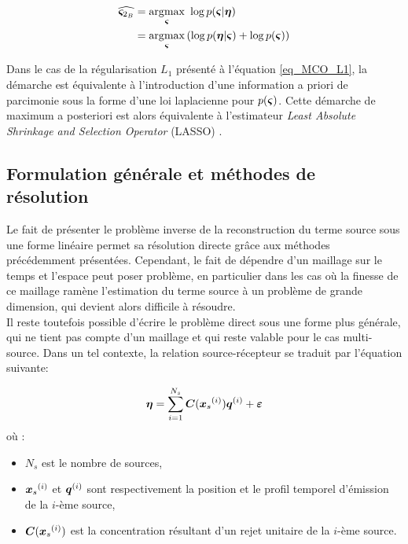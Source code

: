\begin{equation}
{
\begin{split}
\widehat{{\bm{\varsigma}}_{2_B}} &= \operatorname*{\arg\!\max}_{\bm{\varsigma}}~ \log p({\bm{\varsigma}}| {\bm{\eta}}) \\
 &= \operatorname*{\arg\!\max}_ {\bm{\varsigma}}\left(\log p({\bm{\eta}}| {\bm{\varsigma}}) + \log p({\bm{\varsigma}})\right)
\label{eq_MAP}
\end{split}
}
\end{equation}

{
Dans le cas de la régularisation $L_1$ présenté à l'équation \eqref{eq_MCO_L1}, la démarche est équivalente à l'introduction d'une information a priori de parcimonie sous la forme d'une loi laplacienne pour $p({\bm{\varsigma}})$. Cette démarche de maximum a posteriori est alors équivalente à l'estimateur \textit{Least Absolute Shrinkage and Selection Operator} (LASSO) \cite{Tibshirani1996}.\\
}
\subsection{Formulation générale et méthodes de résolution}

Le fait de présenter le problème inverse de la reconstruction du terme source sous une forme linéaire permet sa résolution directe grâce aux méthodes précédemment présentées. Cependant, le fait de dépendre d'un maillage sur le temps et l'espace peut poser problème, en particulier dans les cas où la finesse de ce maillage ramène l'estimation du terme source à un problème de grande dimension, qui devient alors difficile à résoudre. \\

Il reste toutefois possible d'écrire le problème direct sous une forme plus générale, qui ne tient pas compte d'un maillage et qui reste valable pour le cas multi-source. Dans un tel contexte, la relation source-récepteur se traduit par l'équation suivante:

\begin{equation}
	{\bm{\eta}} = \sum\limits_{i=1}^{N_s} {\bm{C}}({\bm{x}_s}^{(i)}){\bm{q}}^{(i)} + {\bm{\varepsilon}}
	\label{eq_SR_nonlineaire}
\end{equation}
où :
\begin{itemize}
	\item $N_s$ est le nombre de sources, 
	\item ${\bm{x}_s}^{(i)}$ et ${\bm{q}}^{(i)}$ sont respectivement la position et le profil temporel d'émission de la $i$-ème source,
	\item ${\bm{C}}({\bm{x}_s}^{(i)})$ est la concentration résultant d'un rejet unitaire de la $i$-ème source.\\
\end{itemize}

